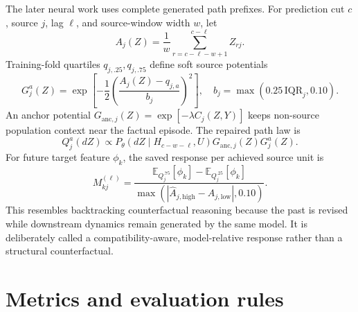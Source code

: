 \documentclass[10pt]{article}
\newcommand{\E}{\mathbb{E}}
\begin{document}
The later neural work uses complete generated path prefixes. For prediction cut $c$, source $j$, lag $\ell$, and source-window width $w$, let
\begin{equation}
 A_j(Z)=\frac1w\sum_{r=c-\ell-w+1}^{c-\ell}Z_{rj}.
\end{equation}
Training-fold quartiles $q_{j,.25},q_{j,.75}$ define soft source potentials
\begin{equation}
 G_j^a(Z)=\exp\!\left[-\frac12\left(\frac{A_j(Z)-q_{j,a}}{b_j}\right)^2\right],
 \quad b_j=\max(0.25\,\mathrm{IQR}_j,0.10).
\end{equation}
An anchor potential $G_{\mathrm{anc},j}(Z)=\exp[-\lambda C_j(Z,Y)]$ keeps non-source population context near the factual episode. The repaired path law is
\begin{equation}
 Q_j^a(dZ)\propto P_\theta(dZ\mid H_{c-w-\ell},U)G_{\mathrm{anc},j}(Z)G_j^a(Z).
\end{equation}
For future target feature $\phi_k$, the saved response per achieved source unit is
\begin{equation}
 M_{kj}^{(\ell)}=
 \frac{\E_{Q_j^{.75}}[\phi_k]-\E_{Q_j^{.25}}[\phi_k]}
 {\max(|\widehat A_{j,\mathrm{high}}-\widehat A_{j,\mathrm{low}}|,0.10)}.
\end{equation}
This resembles backtracking counterfactual reasoning because the past is revised while downstream dynamics remain generated by the same model. It is deliberately called a compatibility-aware, model-relative response rather than a structural counterfactual.

\section{Metrics and evaluation rules}
\end{document}
